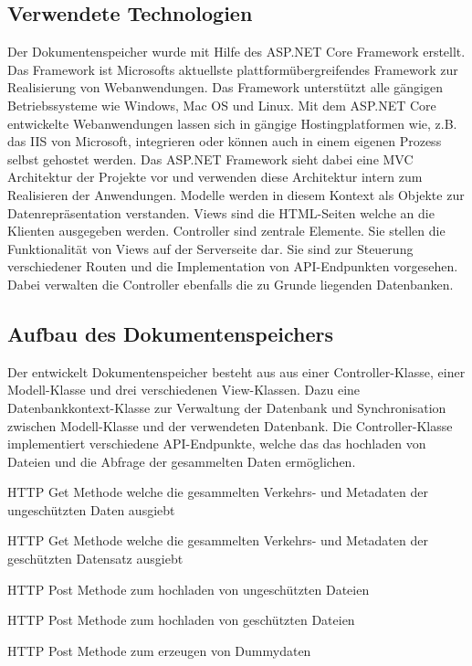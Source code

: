 \documentclass[
    fontsize=12pt,
    headings=small,
    parskip=half,           %
    bibliography=totoc,
    numbers=noenddot,       %
    open=any,               %
    ]{scrreprt}
\begin{document}
    \subsection{Verwendete Technologien}
Der Dokumentenspeicher wurde mit Hilfe des ASP.NET Core Framework erstellt. 
Das Framework ist Microsofts aktuellste plattformübergreifendes Framework zur Realisierung von Webanwendungen.
Das Framework unterstützt alle gängigen Betriebssysteme wie Windows, Mac OS und Linux.
Mit dem ASP.NET Core entwickelte Webanwendungen lassen sich in gängige Hostingplatformen wie, z.B. das \ac{IIS} von Microsoft, integrieren oder können auch in einem eigenen Prozess selbst gehostet werden. 
Das ASP.NET Framework sieht dabei eine \ac{MVC} Architektur der Projekte vor und verwenden diese Architektur intern zum Realisieren der Anwendungen. 
Modelle werden in diesem Kontext als Objekte zur Datenrepräsentation verstanden. 
Views sind die HTML-Seiten welche an die Klienten ausgegeben werden.
Controller sind zentrale Elemente. 
Sie stellen die Funktionalität von Views auf der Serverseite dar.
Sie sind zur Steuerung verschiedener Routen und die Implementation von \ac{API}-Endpunkten vorgesehen.
Dabei verwalten die Controller ebenfalls die zu Grunde liegenden Datenbanken.
    \subsection{Aufbau des Dokumentenspeichers}

Der entwickelt Dokumentenspeicher besteht aus aus einer Controller-Klasse, einer Modell-Klasse und drei verschiedenen View-Klassen.
Dazu eine Datenbankkontext-Klasse zur Verwaltung der Datenbank und Synchronisation zwischen Modell-Klasse und der verwendeten Datenbank.
Die Controller-Klasse implementiert verschiedene \ac{API}-Endpunkte, welche das das hochladen von Dateien und die Abfrage der gesammelten Daten ermöglichen.

\begin{description}[style=nextline]   
\item[/api/GetA] \ac{HTTP} Get Methode welche die gesammelten Verkehrs- und Metadaten der ungeschützten Daten ausgiebt
\item[/api/GetB] \ac{HTTP} Get Methode welche die gesammelten Verkehrs- und Metadaten der geschützten Datensatz ausgiebt
\item[/api/uploadA] \ac{HTTP} Post Methode zum hochladen von ungeschützten Dateien
\item[/api/uploadB] \ac{HTTP} Post Methode zum hochladen von geschützten Dateien
\item[api/uploadEmu] \ac{HTTP} Post Methode zum erzeugen von Dummydaten
\end{description}
\end{document}
